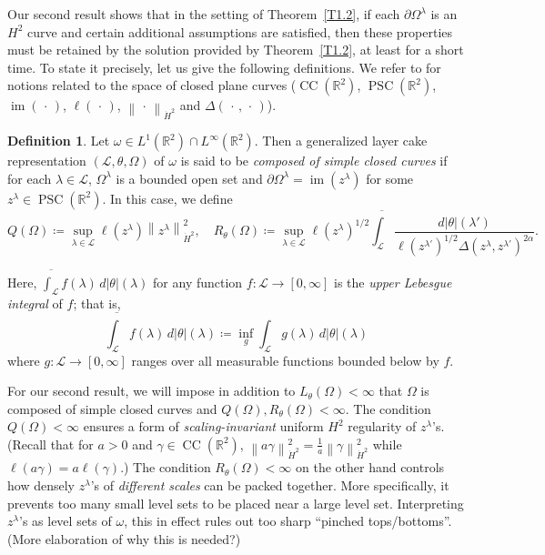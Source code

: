 \documentclass[reqno,centertags,12pt]{amsart}
\theoremstyle{definition}
\newtheorem{definition}[theorem]{Definition}
\numberwithin{equation}{section}
\newcommand{\norm}[1]{\left\|#1\right\|}
\newcommand{\bbR}{{\mathbb{R}}}
\newcommand{\tht}{\theta}
\begin{document}
Our second result shows that in the setting of Theorem~\ref{T1.2},
if each $\partial\Omega^{\lambda}$ is an $H^{2}$ curve
and certain additional assumptions are satisfied, then these properties must be retained
by the solution provided by Theorem~\ref{T1.2}, at least for a short time.
To state it precisely, let us give the following definitions.
We refer to \cite{JeoZlaTouching} for notions related to the space of closed plane curves
($\operatorname{CC}(\bbR^{2})$, $\operatorname{PSC}(\bbR^{2})$,
$\operatorname{im}(\,\cdot\,)$, $\ell(\,\cdot\,)$, $\norm{\,\cdot\,}_{\dot{H}^{2}}$
and $\Delta(\,\cdot\,,\,\cdot\,)$).

\begin{definition}
    Let $\omega\in L^{1}(\bbR^{2})\cap L^{\infty}(\bbR^{2})$.
    Then a generalized layer cake representation $(\mathcal{L},\theta,\Omega)$
    of $\omega$ is said to be \emph{composed of simple closed curves} if for each
    $\lambda\in\mathcal{L}$, $\Omega^{\lambda}$ is a bounded open set and
    $\partial\Omega^{\lambda} = \operatorname{im}(z^{\lambda})$
    for some $z^{\lambda}\in\operatorname{PSC}(\bbR^{2})$.
    In this case, we define
    \begin{equation*}
        Q(\Omega) \coloneqq \sup_{\lambda\in\mathcal{L}}
        \ell(z^{\lambda})\norm{z^{\lambda}}_{\dot{H}^{2}}^{2},\quad
        R_{\tht}(\Omega) \coloneqq \sup_{\lambda\in\mathcal{L}}
        \ell(z^{\lambda})^{1/2}\overline{\int_{\mathcal{L}}}\frac{d|\theta|(\lambda')}
        {\ell(z^{\lambda'})^{1/2}\Delta(z^{\lambda},z^{\lambda'})^{2\alpha}}.
    \end{equation*}
\end{definition}

Here, $\overline{\int_{\mathcal{L}}}f(\lambda)\,d|\theta|(\lambda)$
for any function $f\colon\mathcal{L}\to[0,\infty]$ is the \emph{upper Lebesgue integral}
of $f$; that is,
\[
    \overline{\int_{\mathcal{L}}}f(\lambda)\,d|\theta|(\lambda)
    \coloneqq \inf_{g}\int_{\mathcal{L}}g(\lambda)\,d|\theta|(\lambda)
\]
where $g\colon\mathcal{L}\to[0,\infty]$ ranges over all
measurable functions bounded below by $f$.

For our second result, we will impose in addition to $L_{\tht}(\Omega)<\infty$
that $\Omega$ is composed of simple closed curves and
$Q(\Omega), R_{\tht}(\Omega) < \infty$. The condition $Q(\Omega)<\infty$ ensures
a form of \emph{scaling-invariant} uniform $H^{2}$ regularity of $z^{\lambda}$'s.
(Recall that for $a>0$ and $\gamma\in\operatorname{CC}(\bbR^{2})$,
$\norm{a\gamma}_{\dot{H}^{2}}^{2} = \frac{1}{a}\norm{\gamma}_{\dot{H}^{2}}^{2}$
while $\ell(a\gamma) = a\ell(\gamma)$.)
The condition $R_{\tht}(\Omega)<\infty$ on the other hand controls how densely
$z^{\lambda}$'s of \emph{different scales} can be packed together.
More specifically, it prevents too many small level sets to be placed
near a large level set. Interpreting $z^{\lambda}$'s as level sets of $\omega$,
this in effect rules out too sharp ``pinched tops/bottoms''.
(More elaboration of why this is needed?)
\end{document}
